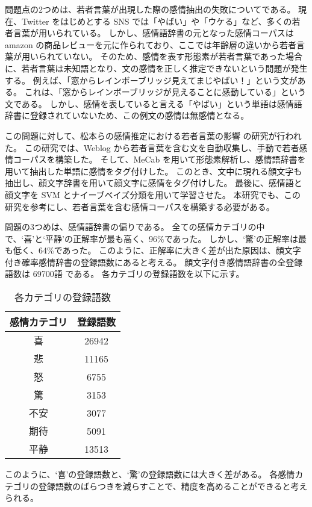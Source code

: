 \documentclass[11pt,a4j]{jsarticle}
\begin{document}
問題点の2つめは、若者言葉が出現した際の感情抽出の失敗についてである。
現在、Twitter をはじめとする SNS では「やばい」や「ウケる」など、多くの若者言葉が用いられている。
しかし、感情語辞書の元となった感情コーパスは amazon の商品レビューを元に作られており、ここでは年齢層の違いから若者言葉が用いられていない。
そのため、感情を表す形態素が若者言葉であった場合に、若者言葉は未知語となり、文の感情を正しく推定できないという問題が発生する。
例えば、「窓からレインボーブリッジ見えてまじやばい！」という文がある。
これは、「窓からレインボーブリッジが見えることに感動している」という文である。
しかし、感情を表していると言える「やばい」という単語は感情語辞書に登録されていないため、この例文の感情は無感情となる。

この問題に対して、松本らの感情推定における若者言葉の影響  の研究が行われた。
この研究では、Weblog から若者言葉を含む文を自動収集し、手動で若者感情コーパスを構築した。
そして、MeCab を用いて形態素解析し、感情語辞書を用いて抽出した単語に感情をタグ付けした。
このとき、文中に現れる顔文字も抽出し、顔文字辞書を用いて顔文字に感情をタグ付けした。
最後に、感情語と顔文字を SVM とナイーブベイズ分類を用いて学習させた。
本研究でも、この研究を参考にし、若者言葉を含む感情コーパスを構築する必要がある。

問題の3つめは、感情語辞書の偏りである。
全ての感情カテゴリの中で、`喜'と`平静'の正解率が最も高く、96\%であった。
しかし、`驚'の正解率は最も低く、64\%であった。
このように、正解率に大きく差が出た原因は、顔文字付き確率感情辞書の登録語数にあると考える。
顔文字付き感情語辞書の全登録語数は 69700語 である。
各カテゴリの登録語数を以下に示す。

\begin{table}[ht]
  \caption{各カテゴリの登録語数}
\centering
\begin{tabular}{c|c} \hline
  感情カテゴリ & 登録語数 \\ \hline \hline
  喜 & 26942 \\ \hline
  悲 & 11165 \\ \hline
  怒 & 6755 \\ \hline
  驚 & 3153 \\ \hline
  不安 & 3077 \\ \hline
  期待 & 5091 \\ \hline
  平静 & 13513 \\ \hline
\end{tabular}
\end{table}

このように、`喜'の登録語数と、`驚'の登録語数には大きく差がある。
各感情カテゴリの登録語数のばらつきを減らすことで、精度を高めることができると考えられる。
\end{document}

